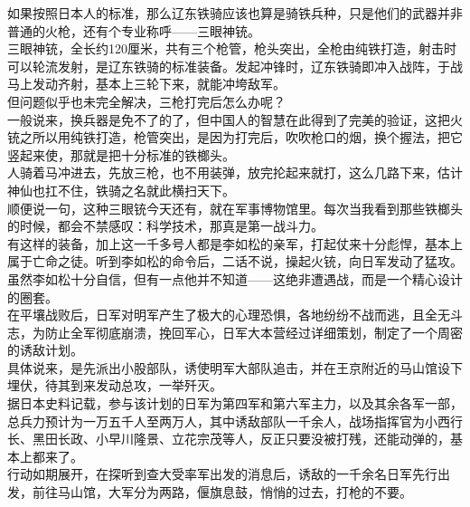 \begin{multicols}{\theparacolNo}
如果按照日本人的标准，那么辽东铁骑应该也算是骑铁兵种，只是他们的武器并非普通的火枪，还有个专业称呼——三眼神铳。\\

三眼神铳，全长约120厘米，共有三个枪管，枪头突出，全枪由纯铁打造，射击时可以轮流发射，是辽东铁骑的标准装备。发起冲锋时，辽东铁骑即冲入战阵，于战马上发动齐射，基本上三轮下来，就能冲垮敌军。\\

但问题似乎也未完全解决，三枪打完后怎么办呢？\\

一般说来，换兵器是免不了的了，但中国人的智慧在此得到了完美的验证，这把火铳之所以用纯铁打造，枪管突出，是因为打完后，吹吹枪口的烟，换个握法，把它竖起来使，那就是把十分标准的铁榔头。\\

人骑着马冲进去，先放三枪，也不用装弹，放完抡起来就打，这么几路下来，估计神仙也扛不住，铁骑之名就此横扫天下。\\

顺便说一句，这种三眼铳今天还有，就在军事博物馆里。每次当我看到那些铁榔头的时候，都会不禁感叹：科学技术，那真是第一战斗力。\\

有这样的装备，加上这一千多号人都是李如松的亲军，打起仗来十分彪悍，基本上属于亡命之徒。听到李如松的命令后，二话不说，操起火铳，向日军发动了猛攻。\\

虽然李如松十分自信，但有一点他并不知道——这绝非遭遇战，而是一个精心设计的圈套。\\

在平壤战败后，日军对明军产生了极大的心理恐惧，各地纷纷不战而逃，且全无斗志，为防止全军彻底崩溃，挽回军心，日军大本营经过详细策划，制定了一个周密的诱敌计划。\\

具体说来，是先派出小股部队，诱使明军大部队追击，并在王京附近的马山馆设下埋伏，待其到来发动总攻，一举歼灭。\\

据日本史料记载，参与该计划的日军为第四军和第六军主力，以及其余各军一部，总兵力预计为一万五千人至两万人，其中诱敌部队一千余人，战场指挥官为小西行长、黑田长政、小早川隆景、立花宗茂等人，反正只要没被打残，还能动弹的，基本上都来了。\\

行动如期展开，在探听到查大受率军出发的消息后，诱敌的一千余名日军先行出发，前往马山馆，大军分为两路，偃旗息鼓，悄悄的过去，打枪的不要。\\


\end{multicols}
